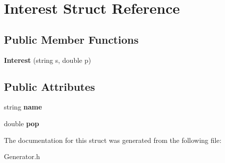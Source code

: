 \hypertarget{struct_interest}{\section{Interest Struct Reference}
\label{struct_interest}
}
\subsection*{Public Member Functions}
\begin{DoxyCompactItemize}
\item 
\hypertarget{struct_interest_a844dd2bb8dc0161f78b8d8684a02721a}{{\bfseries Interest} (string s, double p)}\label{struct_interest_a844dd2bb8dc0161f78b8d8684a02721a}

\end{DoxyCompactItemize}
\subsection*{Public Attributes}
\begin{DoxyCompactItemize}
\item 
\hypertarget{struct_interest_a9da31ac749fa5567497efa03a4bcec5a}{string {\bfseries name}}\label{struct_interest_a9da31ac749fa5567497efa03a4bcec5a}

\item 
\hypertarget{struct_interest_a4284a34b5b8b6ed5f07c9d32c4529014}{double {\bfseries pop}}\label{struct_interest_a4284a34b5b8b6ed5f07c9d32c4529014}

\end{DoxyCompactItemize}


The documentation for this struct was generated from the following file\-:\begin{DoxyCompactItemize}
\item 
Generator.\-h\end{DoxyCompactItemize}
